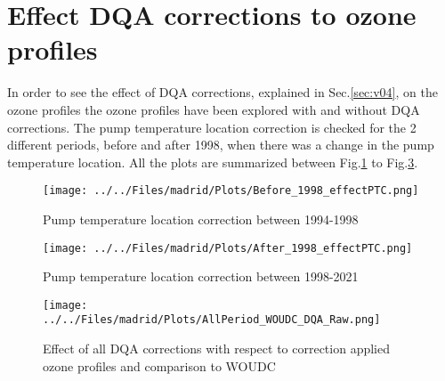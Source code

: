     \section{Effect DQA corrections to ozone profiles }

    In order to see the effect of DQA corrections, explained in Sec.\ref{sec:v04}, on the ozone profiles the ozone profiles have been
explored with and without DQA corrections. The pump temperature location correction is checked for the 2 different periods, before and after 1998, when there was a change
in the pump temperature location.
    All the plots are summarized between Fig.\ref{fig:pl_before} to Fig.\ref{fig:op_all}.


                                \begin{figure}
        \centering
\texttt{[image: ../../Files/madrid/Plots/Before\_1998\_effectPTC.png]}
    \caption{Pump temperature location correction between 1994-1998}
            \label{fig:pl_before}
    \end{figure}

                                    \begin{figure}
        \centering
\texttt{[image: ../../Files/madrid/Plots/After\_1998\_effectPTC.png]}
    \caption{Pump temperature location correction between 1998-2021}
            \label{fig:pl_after}
    \end{figure}
                                    \begin{figure}


\texttt{[image: ../../Files/madrid/Plots/AllPeriod\_WOUDC\_DQA\_Raw.png]}
    \caption{Effect of all DQA corrections with respect to correction applied ozone profiles and comparison to WOUDC}
            \label{fig:op_all}
    \end{figure}



